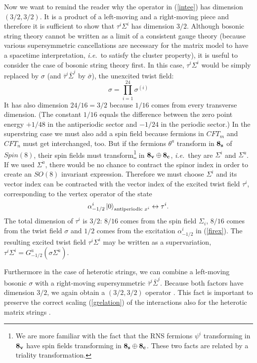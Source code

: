 \documentclass[nohyper,12pt,letterpaper]{JHEP3}
\def \lr{\leftrightarrow}
\def \eqref#1{(\ref{#1})}
\def \ket#1{\left\vert #1\right\rangle}
\def \eqn#1#2{\begin{equation}#2\label{#1}\end{equation}}
\def \da{{\dot a}}
\begin{document}
Now we want to remind the reader why the operator in (\ref{intee}) has
dimension $(3/2,3/2)$. It is a product of a left-moving and a
right-moving piece and therefore it is sufficient to show that
$\tau^i\Sigma^i$ has dimension $3/2$. Although bosonic string theory
cannot be written as a limit of a consistent gauge theory (because
various supersymmetric cancellations are necessary for the matrix
model to have a spacetime interpretation, {\it i.e.}\ to satisfy the 
cluster
property), it is useful to consider the case of bosonic string theory
first.  In this case, $\tau^i\Sigma^i$ would be simply replaced by
$\sigma$ (and $\bar \tau^i \bar\Sigma^i$ by $\bar \sigma$), the
unexcited twist field:
%
\eqn{twistun}{\sigma = \prod_{i=1}^{24} \sigma^{(i)}}
%
It has also dimension $24/16=3/2$ because $1/16$ comes from every
transverse dimension. (The constant $1/16$ equals the difference
between the zero point energy $+1/48$ in the antiperiodic sector and
$-1/24$ in the periodic sector.) In the superstring case we must also
add a spin field because fermions in $CFT_m$ and $CFT_n$ must get
interchanged, too.  But if the fermions $\theta^a$ transform in ${\bf
8_s}$ of $Spin(8)$, their spin fields must transform\footnote{We are
more familiar with the fact that the RNS fermions $\psi^i$
transforming in ${\bf 8_v}$ have spin fields transforming in ${\bf
8_s}\oplus {\bf 8_c}$. These two facts are related by a triality
transformation.}  in ${\bf 8_v}\oplus {\bf 8_c}$, {\it i.e.}\ they are
$\Sigma^i$ and $\Sigma^{\da}$. If we used $\Sigma^\da$, there would be
no chance to contract the spinor index in order to create an $SO(8)$
invariant expression. Therefore we must choose $\Sigma^i$ and its
vector index can be contracted with the vector index of the excited
twist field $\tau^i$, corresponding to the vertex operator of the
state
%
\eqn{firex}{\alpha^i_{-1/2}\ket{0}_{\mbox{\scriptsize antiperiodic } x^i} 
\lr \tau^i.}
%
The total dimension of $\tau^i$ is $3/2$: $8/16$ comes from the spin
field $\Sigma_i$, $8/16$ comes from the twist field $\sigma$ and $1/2$
comes from the excitation $\alpha_{-1/2}^i$ in (\ref{firex}).  The
resulting excited twist field $\tau^i\Sigma^i$ may be written as a
supervariation, $\tau^i\Sigma^i=G^\da_{-1/2}(\sigma \Sigma^\da)$.

Furthermore in the case of heterotic strings, we can combine a
left-moving bosonic $\sigma$ with a right-moving supersymmetric
$\bar\tau^i\bar\Sigma^i$. Because both factors have dimension $3/2$,
we again obtain a $(3/2,3/2)$ operator \cite{heterej}.  This fact is
important to preserve the correct scaling \eqref{grelation} of the
interactions also for the heterotic matrix strings
\cite{bamohete,matihorava}.
\end{document}
